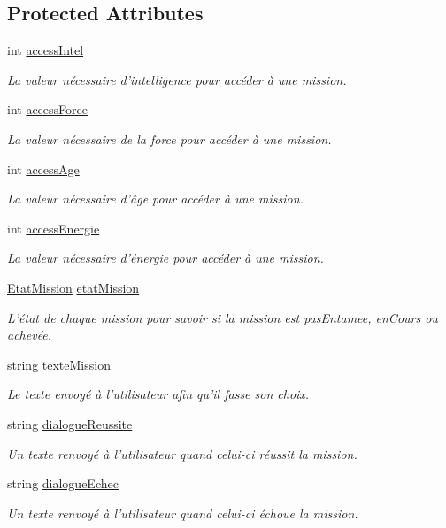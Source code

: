 \subsection*{Protected Attributes}
\begin{DoxyCompactItemize}
\item 
int \hyperlink{class_mission_af93302ac38548302411994e4cbf9b850}{access\-Intel}
\begin{DoxyCompactList}\small\item\em La valeur nécessaire d'intelligence pour accéder à une mission. \end{DoxyCompactList}\item 
int \hyperlink{class_mission_a58a62ea21f7c074d87e8592a009dec49}{access\-Force}
\begin{DoxyCompactList}\small\item\em La valeur nécessaire de la force pour accéder à une mission. \end{DoxyCompactList}\item 
int \hyperlink{class_mission_a78226357c57649c261115d34598f9a8e}{access\-Age}
\begin{DoxyCompactList}\small\item\em La valeur nécessaire d'âge pour accéder à une mission. \end{DoxyCompactList}\item 
int \hyperlink{class_mission_ae767714f7433f66f519468bc1913a5ef}{access\-Energie}
\begin{DoxyCompactList}\small\item\em La valeur nécessaire d'énergie pour accéder à une mission. \end{DoxyCompactList}\item 
\hyperlink{mission_8hpp_ace9df1e8554ba5a57340fb42cee370f7}{Etat\-Mission} \hyperlink{class_mission_a7a3a8c801854fdbc1ddfb73d187e5b2e}{etat\-Mission}
\begin{DoxyCompactList}\small\item\em L'état de chaque mission pour savoir si la mission est pas\-Entamee, en\-Cours ou achevée. \end{DoxyCompactList}\item 
string \hyperlink{class_mission_ac289a213c14ea87ba5740be349c23419}{texte\-Mission}
\begin{DoxyCompactList}\small\item\em Le texte envoyé à l'utilisateur afin qu'il fasse son choix. \end{DoxyCompactList}\item 
string \hyperlink{class_mission_a75d8fc66d0ed01f1f1192e03528a2612}{dialogue\-Reussite}
\begin{DoxyCompactList}\small\item\em Un texte renvoyé à l'utilisateur quand celui-\/ci réussit la mission. \end{DoxyCompactList}\item 
string \hyperlink{class_mission_aeb543b4e12125834e6b8901820db243b}{dialogue\-Echec}
\begin{DoxyCompactList}\small\item\em Un texte renvoyé à l'utilisateur quand celui-\/ci échoue la mission. \end{DoxyCompactList}\end{DoxyCompactItemize}
